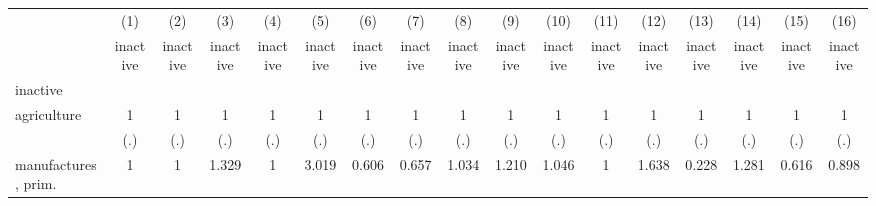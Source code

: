 {
\def\sym#1{\ifmmode^{#1}\else\(^{#1}\)\fi}
\begin{tabular}{l*{16}{c}}
\hline\hline
                    &\multicolumn{1}{c}{(1)}&\multicolumn{1}{c}{(2)}&\multicolumn{1}{c}{(3)}&\multicolumn{1}{c}{(4)}&\multicolumn{1}{c}{(5)}&\multicolumn{1}{c}{(6)}&\multicolumn{1}{c}{(7)}&\multicolumn{1}{c}{(8)}&\multicolumn{1}{c}{(9)}&\multicolumn{1}{c}{(10)}&\multicolumn{1}{c}{(11)}&\multicolumn{1}{c}{(12)}&\multicolumn{1}{c}{(13)}&\multicolumn{1}{c}{(14)}&\multicolumn{1}{c}{(15)}&\multicolumn{1}{c}{(16)}\\
                    &\multicolumn{1}{c}{inactive}&\multicolumn{1}{c}{inactive}&\multicolumn{1}{c}{inactive}&\multicolumn{1}{c}{inactive}&\multicolumn{1}{c}{inactive}&\multicolumn{1}{c}{inactive}&\multicolumn{1}{c}{inactive}&\multicolumn{1}{c}{inactive}&\multicolumn{1}{c}{inactive}&\multicolumn{1}{c}{inactive}&\multicolumn{1}{c}{inactive}&\multicolumn{1}{c}{inactive}&\multicolumn{1}{c}{inactive}&\multicolumn{1}{c}{inactive}&\multicolumn{1}{c}{inactive}&\multicolumn{1}{c}{inactive}\\
\hline
inactive            &                     &                     &                     &                     &                     &                     &                     &                     &                     &                     &                     &                     &                     &                     &                     &                     \\
agriculture         &           1         &           1         &           1         &           1         &           1         &           1         &           1         &           1         &           1         &           1         &           1         &           1         &           1         &           1         &           1         &           1         \\
                    &         (.)         &         (.)         &         (.)         &         (.)         &         (.)         &         (.)         &         (.)         &         (.)         &         (.)         &         (.)         &         (.)         &         (.)         &         (.)         &         (.)         &         (.)         &         (.)         \\
[1em]
manufactures, prim. &           1         &           1         &       1.329         &           1         &       3.019         &       0.606         &       0.657         &       1.034         &       1.210         &       1.046         &           1         &       1.638         &       0.228         &       1.281         &       0.616         &       0.898         \\

\end{tabular}}
